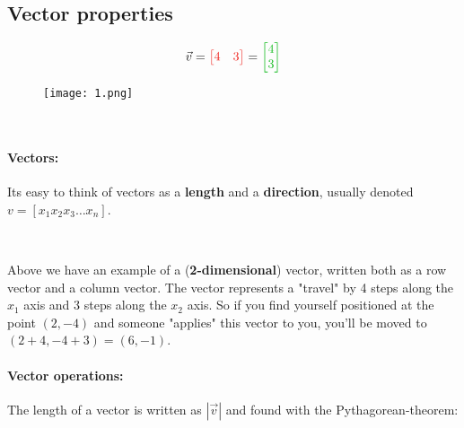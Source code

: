 \documentclass{article}
\begin{document}
\color{white}\subsection{Vector properties}\color{black}


\begin{minipage}{0.1\textwidth}
\quad
\end{minipage}
\begin{minipage}{0.25\textwidth}
\begin{align*}
\vec{v}  = \color{rooj} \begin{bmatrix} 4 & 3 \end{bmatrix}  \color{black}
 =  \color{groen} \begin{bmatrix} 4 \\ 3 \end{bmatrix}  \color{black}
\end{align*}
\end{minipage} \hfill
\begin{minipage}{0.4\textwidth}
\begin{figure}[H]
\texttt{[image: 1.png]}
\end{figure}
\end{minipage}
\begin{minipage}{0.1\textwidth}
\quad
\end{minipage}

\

\paragraph{Vectors: } Its easy to think of vectors as a \textbf{length} and a \textbf{direction}, usually denoted $v = [x_1  x_2  x_3  \dots  x_n]$.

\

Above we have an example of  a (\textbf{2-dimensional}) vector, written both as a \color{rooj} row vector \color{black} and a \color{groen} column vector\color{black}. The vector represents a "travel" by 4 steps along the $x_1$ axis and 3 steps along the $x_2$ axis. So if you find yourself positioned at the point $(2,-4)$ and someone "applies" this vector to you, you'll be moved to $(2+4, -4+3) = (6,-1)$.

\paragraph{Vector operations: }


The length of a vector is written as $|\vec{v}|$ and found with the Pythagorean-theorem:
\end{document}
